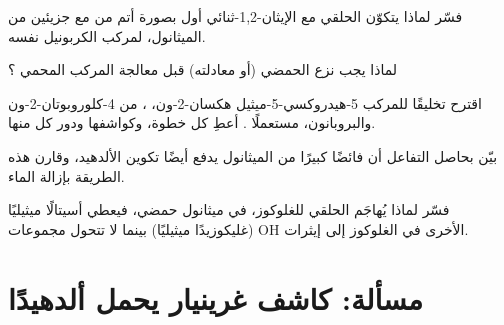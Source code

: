\begin{exercise}[$\star\star$]\label{exo:b1:acetals-protection:8}
فسّر لماذا يتكوّن  الحلقي مع الإيثان-1,2-ثنائي أول بصورة أتم
من  مع جزيئين من الميثانول، لمركب الكربونيل
نفسه.
\end{exercise}

\begin{exercise}[$\star\star$]\label{exo:b1:acetals-protection:9}
لماذا يجب نزع  الحمضي (أو معادلته) قبل معالجة المركب
المحمي ؟
\end{exercise}

\begin{exercise}[$\star\star\star$]\label{exo:b1:acetals-protection:10}
اقترح تخليقًا للمركب 5-هيدروكسي-5-ميثيل هكسان-2-ون،
، من 4-كلوروبوتان-2-ون والبروبانون، مستعملًا
. أعطِ كل خطوة، وكواشفها ودور كل منها.
\end{exercise}

\begin{exercise}[$\star\star\star$]\label{exo:b1:acetals-protection:11}
بيّن بحاصل التفاعل أن فائضًا كبيرًا من الميثانول يدفع أيضًا
تكوين  الألدهيد، وقارن هذه الطريقة
بإزالة الماء.
\end{exercise}

\begin{exercise}[$\star\star\star$]\label{exo:b1:acetals-protection:12}
فسّر لماذا يُهاجَم  الحلقي للغلوكوز، في ميثانول
حمضي، فيعطي أسيتالًا ميثيليًا (غليكوزيدًا ميثيليًا) بينما لا تتحول مجموعات OH
الأخرى في الغلوكوز إلى إيثرات.
\end{exercise}

\section{مسألة: كاشف غرينيار يحمل ألدهيدًا}

